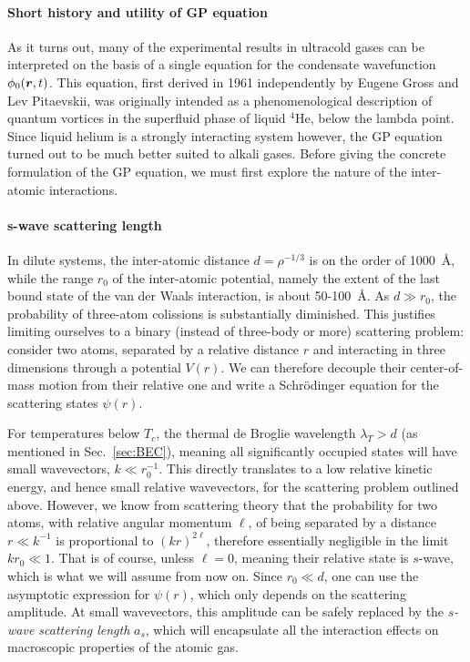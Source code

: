 \paragraph{Short history and utility of GP equation}
As it turns out, many of the experimental results in ultracold gases
can be interpreted on the basis of a single equation for the
condensate wavefunction $\phi_0(\bm{r},t)$. This equation, first derived
in 1961 independently by Eugene Gross and Lev Pitaevskii, was
originally intended as a phenomenological description of quantum
vortices in the superfluid phase of liquid ${}^4$He, below the lambda
point. Since liquid helium is a strongly interacting system however,
the GP equation turned out to be much better suited to alkali gases.
Before giving the concrete formulation of the GP equation, we must
first explore the nature of the inter-atomic interactions.

\paragraph{s-wave scattering length}
In dilute systems, the inter-atomic distance $d = \rho^{-1/3}$ is on
the order of 1000~\AA, while the range $r_0$ of the inter-atomic
potential, namely the extent of the last bound state of the van der
Waals interaction, is about 50-100~\AA. As $d \gg r_0$, the
probability of three-atom colissions is substantially diminished. This
justifies limiting ourselves to a binary (instead of three-body or
more) scattering problem: consider two atoms, separated by a relative
distance $r$ and interacting in three dimensions through a potential
$V(r)$. We can therefore decouple their center-of-mass motion from
their relative one and write a Schr\"{o}dinger equation for the
scattering states $\psi(r)$.

For temperatures below $T_c$, the thermal de Broglie wavelength
$\lambda_T > d$ (as mentioned in Sec.~\ref{sec:BEC}), meaning all
significantly occupied states will have small wavevectors,
$k \ll r_0^{-1}$. This directly translates to a low relative kinetic
energy, and hence small relative wavevectors, for the scattering
problem outlined above. However, we know from scattering theory that
the probability for two atoms, with relative angular momentum $\ell$,
of being separated by a distance $r \ll k^{-1}$ is proportional to
$(kr)^{2\ell}$, therefore essentially negligible in the limit
$k r_0 \ll 1$. That is of course, unless $\ell = 0$, meaning their
relative state is $s$-wave, which is what we will assume from now
on. Since $r_0 \ll d$, one can use the asymptotic expression for
$\psi(r)$, which only depends on the scattering amplitude. At small
wavevectors, this amplitude can be safely replaced by the
\textit{$s$-wave scattering length} $a_s$, which will encapsulate all
the interaction effects on macroscopic properties of the atomic gas.

